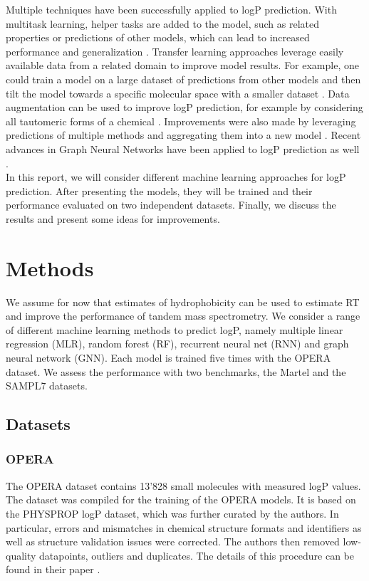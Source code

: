 \documentclass{article}
\theoremstyle{definition}
\theoremstyle{remark}
\begin{document}
Multiple techniques have been successfully applied to logP prediction. With multitask learning, helper tasks are added to the model, such as related properties or predictions of other models, which can lead to increased performance and generalization \cite{lenselink2021multitask, capela2019multitask}. Transfer learning approaches leverage easily available data from a related domain to improve model results. For example, one could train a model on a large dataset of predictions from other models and then tilt the model towards a specific molecular space with a smaller dataset \cite{chen2021mrlogp}. Data augmentation can be used to improve logP prediction, for example by considering all tautomeric forms of a chemical \cite{ulrich2021exploring}. Improvements were also made by leveraging predictions of multiple methods and aggregating them into a new model \cite{plante2018jplogp}. Recent advances in Graph Neural Networks have been applied to logP prediction as well \cite{wieder2020compact}. \\

In this report, we will consider different machine learning approaches for logP prediction. After presenting the models, they will be trained and their performance evaluated on two independent datasets. Finally, we discuss the results and present some ideas for improvements.

\section{Methods}

We assume for now that estimates of hydrophobicity can be used to estimate RT and improve the performance of tandem mass spectrometry. We consider a range of different machine learning methods to predict logP, namely multiple linear regression (MLR), random forest (RF), recurrent neural net (RNN) and graph neural network (GNN). Each model is trained five times with the OPERA dataset. We assess the performance with two benchmarks, the Martel and the SAMPL7 datasets.

\subsection{Datasets}
\subsubsection{OPERA}

The OPERA dataset contains 13'828 small molecules with measured logP values. The dataset was compiled for the training of the OPERA models. It is based on the PHYSPROP logP dataset, which was further curated by the authors. In particular, errors and mismatches in chemical structure formats and identifiers as well as structure validation issues were corrected. The authors then removed low-quality datapoints, outliers and duplicates. The details of this procedure can be found in their paper \cite{mansouri2018opera}. \\
\end{document}
